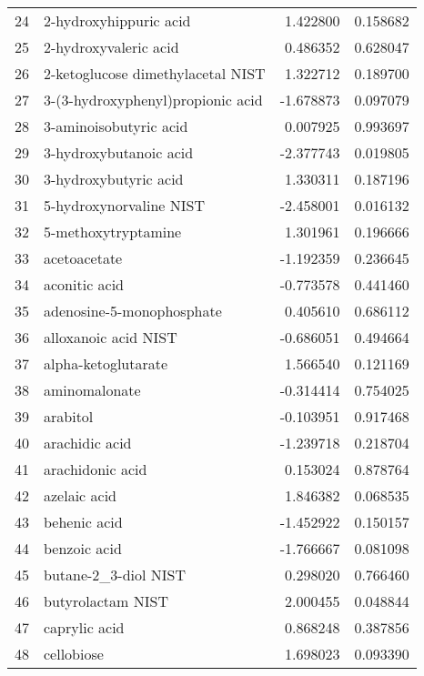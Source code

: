 \begin{tabular}{llrr}
24  &             2-hydroxyhippuric acid &  1.422800 &  0.158682 \\
25  &              2-hydroxyvaleric acid &  0.486352 &  0.628047 \\
26  &  2-ketoglucose dimethylacetal NIST &  1.322712 &  0.189700 \\
27  &  3-(3-hydroxyphenyl)propionic acid & -1.678873 &  0.097079 \\
28  &             3-aminoisobutyric acid &  0.007925 &  0.993697 \\
29  &             3-hydroxybutanoic acid & -2.377743 &  0.019805 \\
30  &              3-hydroxybutyric acid &  1.330311 &  0.187196 \\
31  &            5-hydroxynorvaline NIST & -2.458001 &  0.016132 \\
32  &                5-methoxytryptamine &  1.301961 &  0.196666 \\
33  &                       acetoacetate & -1.192359 &  0.236645 \\
34  &                      aconitic acid & -0.773578 &  0.441460 \\
35  &          adenosine-5-monophosphate &  0.405610 &  0.686112 \\
36  &               alloxanoic acid NIST & -0.686051 &  0.494664 \\
37  &                alpha-ketoglutarate &  1.566540 &  0.121169 \\
38  &                      aminomalonate & -0.314414 &  0.754025 \\
39  &                           arabitol & -0.103951 &  0.917468 \\
40  &                     arachidic acid & -1.239718 &  0.218704 \\
41  &                   arachidonic acid &  0.153024 &  0.878764 \\
42  &                       azelaic acid &  1.846382 &  0.068535 \\
43  &                       behenic acid & -1.452922 &  0.150157 \\
44  &                       benzoic acid & -1.766667 &  0.081098 \\
45  &               butane-2\_3-diol NIST &  0.298020 &  0.766460 \\
46  &                  butyrolactam NIST &  2.000455 &  0.048844 \\
47  &                      caprylic acid &  0.868248 &  0.387856 \\
48  &                         cellobiose &  1.698023 &  0.093390 \\

\end{tabular}
